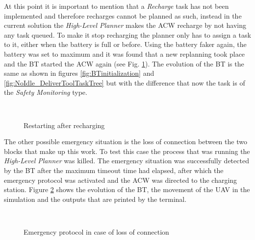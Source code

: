 At this point it is important to mention that a \emph{Recharge} task has not been implemented and therefore recharges cannot be planned as such, instead in the current solution the \emph{High-Level Planner} makes the \gls{ACW} recharge by not having any task queued. To make it stop recharging the planner only has to assign a task to it, either when the battery is full or before. Using the battery faker again, the battery was set to maximum and it was found that a new replanning took place and the \gls{BT} started the \gls{ACW} again (see Fig. \ref{fig:event_batteryOK}). The evolution of the \gls{BT} is the same as shown in figures \ref{fig:BTinitialization} and \ref{fig:NoIdle_DeliverToolTaskTree} but with the difference that now the task is of the \emph{Safety Monitoring} type.

\begin{figure}[htbp]
    \centering
    \hfill
    \\
        \hfill
    \caption{Restarting after recharging}
    \label{fig:event_batteryOK}
\end{figure}

The other possible emergency situation is the loss of connection between the two blocks that make up this work. To test this case the process that was running the \emph{High-Level Planner} was killed. The emergency situation was successfully detected by the \gls{BT} after the maximum timeout time had elapsed, after which the emergency protocol was activated and the \gls{ACW} was directed to the charging station. Figure \ref{fig:event_AgentConnection} shows the evolution of the \gls{BT}, the movement of the \gls{UAV} in the simulation and the outputs that are printed by the terminal.

\begin{figure}[htbp]
    \centering
    \hfill
    \\
        \hfill
    \caption{Emergency protocol in case of loss of connection}
    \label{fig:event_AgentConnection}
\end{figure}


